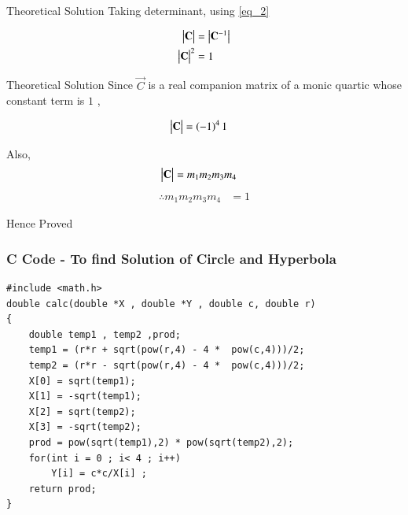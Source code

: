 \documentclass{beamer}
\begin{document}
\begin{frame}{Theoretical Solution}
Taking determinant, using \ref{eq_2}

\begin{align}
    \begin{vmatrix}\mathbf{C}\end{vmatrix} &= \begin{vmatrix}\mathbf{C}^{-1}\end{vmatrix}\\
    \begin{vmatrix}\mathbf{C}\end{vmatrix}^2 &= 1 
\end{align}
\end{frame}
\begin{frame}{Theoretical Solution}
Since $\vec{C}$ is a real companion matrix of a monic quartic whose constant term is $1$ , 

\begin{align}
  \begin{vmatrix}\mathbf{C}\end{vmatrix} &= \left(-1\right)^4 1 
\end{align}

Also, 
\begin{align}
  \begin{vmatrix}\mathbf{C}\end{vmatrix} &= m_1m_2m_3m_4
\end{align}
\begin{align}
    \therefore m_1m_2m_3m_4 &= 1 
\end{align}

Hence Proved
\end{frame}


\begin{frame}[fragile]
    \frametitle{C Code - To find Solution of Circle and Hyperbola }
    \begin{lstlisting}
#include <math.h>
double calc(double *X , double *Y , double c, double r)
{
    double temp1 , temp2 ,prod; 
    temp1 = (r*r + sqrt(pow(r,4) - 4 *  pow(c,4)))/2;
    temp2 = (r*r - sqrt(pow(r,4) - 4 *  pow(c,4)))/2; 
    X[0] = sqrt(temp1);
    X[1] = -sqrt(temp1);
    X[2] = sqrt(temp2);
    X[3] = -sqrt(temp2);
    prod = pow(sqrt(temp1),2) * pow(sqrt(temp2),2);
    for(int i = 0 ; i< 4 ; i++)
        Y[i] = c*c/X[i] ;
    return prod;
}


    \end{lstlisting}
\end{frame}
\end{document}
